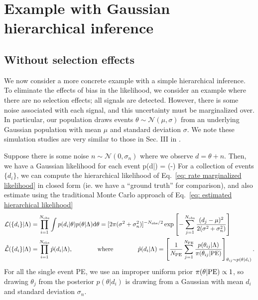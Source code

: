 \section{Example with Gaussian hierarchical inference}
\label{sec: mc gaussian example}
\subsection{Without selection effects}
\label{subsec: mc example without selection effects}

We now consider a more concrete example with a simple hierarchical inference. To eliminate the effects of bias in the likelihood, we consider an example where there are no selection effects; all signals are detected. However, there is some noise associated with each signal, and this uncertainty must be marginalized over. In particular, our population draws events $\theta \sim \mathcal{N}(\mu, \sigma)$ from an underlying Gaussian population with mean $\mu$ and standard deviation $\sigma$. We note these simulation studies are very similar to those in Sec. III in \citet{Essick:2022ojx}.

Suppose there is some noise $n\sim\mathcal{N}(0, \sigma_n)$ where we observe $d=\theta+n$. Then, we have a Gaussian likelihood for each event
\beq
p(d|\theta) = \exp\left(-\right)
\eeq
For a collection of events $\{d_i\}$, we can compute the hierarchical likelihood of Eq.~\ref{eq: rate marginalized likelihood} in closed form (ie. we have a ``ground truth'' for comparison), and also estimate using the traditional Monte Carlo approach of Eq.~\ref{eq: estimated hierarchical likelihood}
\begin{align}
\mathcal{L}(\{d_i\}|\Lambda) &= \prod_{i=1}^{N_{\rm obs}} \int p(d_i|\theta)p(\theta|\Lambda)\dd\theta = [2\pi(\sigma^2 + \sigma_n^2)]^{-N_{\rm obs} / 2}\exp\left[-\sum_{j=1}^{N_{\rm obs}}\frac{(d_j - \mu)^2}{2(\sigma^2 + \sigma_n^2)}\right] 
\label{eq: analytic gaussian likelihood} \\
\hat{\mathcal{L}}(\{d_i\}|\Lambda) &= \prod_{i=1}^{N_{\rm obs}}\hat{p}(d_i|\Lambda),
\qquad\qquad{\rm where}\qquad\qquad
\hat{p}(d_i|\Lambda)=\left[\frac{1}{N_{\rm PE}}\sum_{j=1}^{N_{\rm PE}}\frac{p(\theta_{ij}|\Lambda)}{\pi(\theta_{ij}|{\rm PE})}\right]_{\theta_{ij} \sim p(\theta|d_i)}.
\label{eq: estimated gaussian likelihood}
\end{align}
For all the single event \ac{PE}, we use an improper uniform prior $\pi(\theta|{\rm PE})\propto 1$, so drawing $\theta_j$ from the posterior $p(\theta|d_i)$ is drawing from a Gaussian with mean $d_i$ and standard deviation $\sigma_n$. 


